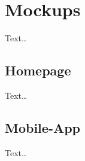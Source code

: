 \chapter{Mockups}
\label{ch:app-A}

Text\dots

\section{Homepage}
\label{sec:app-AI}

Text\dots\clearpage

\section{Mobile-App}
\label{sec:app-AII}

Text\dots